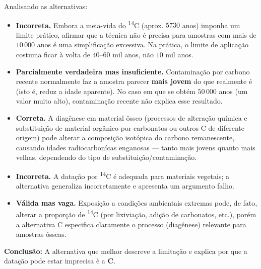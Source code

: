 \begin{flushleft}
Analisando as alternativas:

\begin{itemize}
    \item[(A)] \textbf{Incorreta.} Embora a meia-vida do \textsuperscript{14}C (aprox. $5730$ anos) imponha um limite pr\'atico, afirmar que a t\'ecnica n\~ao \'e precisa para amostras com mais de $10\,000$ anos \'e uma simplifica\c{c}\~ao excessiva. Na pr\'atica, o limite de aplica\c{c}\~ao costuma ficar \`a volta de $40$–$60$ mil anos, n\~ao $10$ mil anos.
    \item[(B)] \textbf{Parcialmente verdadeira mas insuficiente.} Contamina\c{c}\~ao por carbono recente normalmente faz a amostra parecer \textbf{mais jovem} do que realmente \'e (isto \'e, reduz a idade aparente). No caso em que se obt\'em $50\,000$ anos (um valor muito alto), contamina\c{c}\~ao recente n\~ao explica esse resultado.
    \item[(C)] \textbf{Correta.} A diag\^enese em material \^osseo (processos de altera\c{c}\~ao qu\'imica e substitui\c{c}\~ao de material org\^anico por carbonatos ou outros C de diferente origem) pode alterar a composi\c{c}\~ao isot\'opica do carbono remanescente, causando idades radiocarbon\'icas enganosas — tanto mais jovens quanto mais velhas, dependendo do tipo de substitui\c{c}\~ao/contamina\c{c}\~ao.
    \item[(D)] \textbf{Incorreta.} A data\c{c}\~ao por \textsuperscript{14}C \'e adequada para materiais vegetais; a alternativa generaliza incorretamente e apresenta um argumento falho.
    \item[(E)] \textbf{V\'alida mas vaga.} Exposi\c{c}\~ao a condi\c{c}\~oes ambientais extremas pode, de fato, alterar a propor\c{c}\~ao de \textsuperscript{14}C (por lixivia\c{c}\~ao, adi\c{c}\~ao de carbonatos, etc.), porém a alternativa C especifica claramente o processo (diag\^enese) relevante para amostras \^osseas.
\end{itemize}

\textbf{Conclusão:} A alternativa que melhor descreve a limita\c{c}\~ao e explica por que a data\c{c}\~ao pode estar imprecisa \`e a \colorbox{green!50}{\textbf{C}}.


\end{flushleft}

